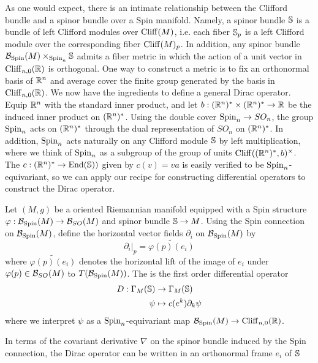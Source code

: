 %
As one would expect, there is an intimate relationship between the Clifford bundle
and a spinor bundle over a Spin manifold. Namely, a spinor bundle $\S$ is a
bundle of left Clifford modules over $\Cliff(M)$, i.e. each fiber $\S_p$ is a left
Clifford module over the corresponding fiber $\Cliff(M)_p$.
In addition, any spinor bundle $\B_{\Spin}(M) \times_{\Spin_n}\S$ admits a fiber metric
in which the action of a unit vector in $\Cliff_{n,0}(\R)$ is orthogonal. One way
to construct a metric is to fix an orthonormal basis of $\R^n$ and average
cover the finite group generated by the basis in $\Cliff_{n,0}(\R)$. We now have the
ingredients to define a general Dirac operator. \\
%

Equip $\R^n$ with the standard inner product, and let
$b :(\R^n)^* \times (\R^n)^* \to \R$ be the induced inner product on $(\R^n)^*$.
Using the double cover $\Spin_n \to SO_n$, the group $\Spin_n$ acts on
$(\R^n)^*$ through the dual representation of $SO_n$ on $(\R^n)^*$. In addition,
$\Spin_n$ acts naturally on any Clifford module $\S$ by left multiplication, where
we think of $\Spin_n$ as a subgroup of the group of units
$\Cliff((\R^n)^*, b)^\times$. The 
$c : (\R^n)^* \to \End(\S))$ given by $c(v) = va$ is easily
verified to be $\Spin_n$-equivariant, so we can apply our recipe for
constructing differential operators to construct the Dirac operator.
%
\begin{defn}
 Let $(M,g)$ be a oriented Riemannian manifold equipped with a Spin structure
 $\varphi : \B_{\Spin}(M) \to \B_{SO}(M)$ and spinor bundle $\S \to M$.
 Using the Spin connection on $\B_{\Spin}(M)$, define the horizontal
 vector fields $\partial_i$ on $\B_{\Spin}(M)$ by
 \[
  \partial_i\vert_p = \widetilde{\varphi(p)(e_i)}
 \]
 where $\widetilde{\varphi(p)(e_i)}$ denotes the horizontal lift of the
 image of $e_i$ under $\varphi(p) \in \B_{SO}(M)$ to $T(\B_{\Spin}(M))$.
 The  is the first order differential operator
 \begin{align*}
  D : \Gamma_M(\S) & \to \Gamma_M(\S)          \\
  \psi                & \mapsto c(e^k)\partial_k\psi
 \end{align*}
 where we interpret $\psi$ as a $\Spin_n$-equivariant map
 $\B_{\Spin}(M) \to \Cliff_{n,0}(\R)$.
\end{defn}
In terms of the covariant derivative $\nabla$ on the spinor bundle induced by the Spin
connection, the Dirac operator can be written in an orthonormal frame $e_i$ of $\S$
